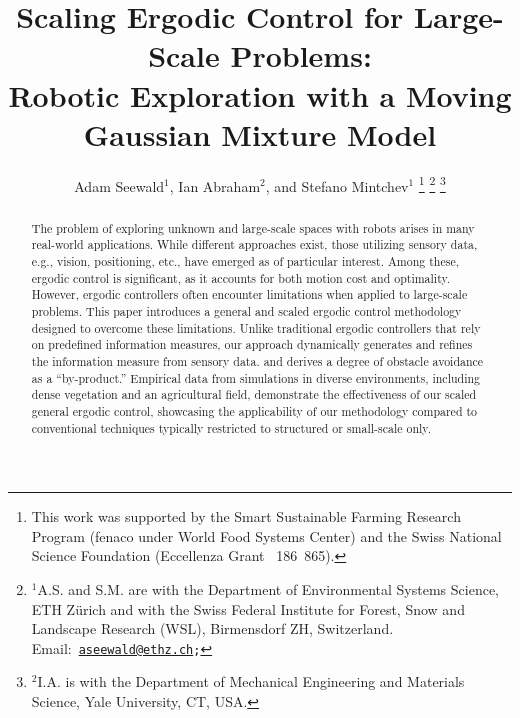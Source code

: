 \documentclass[letterpaper,10pt,conference,twoside]{IEEEtran}
\theoremstyle{definition}
\begin{document}

\title{\LARGE\bf Scaling Ergodic Control for Large-Scale Problems:\\Robotic Exploration with a Moving Gaussian Mixture Model}

\author{Adam Seewald${}^{\text{1}}$, Ian Abraham${}^{\text{2}}$, and Stefano Mintchev${}^{\text{1}}$
  \thanks{%
  This work was supported by the Smart Sustainable Farming Research Program (fenaco under World Food Systems Center) and the Swiss National Science Foundation (Eccellenza Grant \textnumero~186~865).}
  \thanks{${}^{\text{1}}$A.\hspace*{.4ex}S. and S.\hspace*{.4ex}M. are with the Department of Environmental Systems Science, ETH Z{\"u}rich and with the Swiss Federal Institute for Forest, Snow and Landscape Research (WSL), Birmensdorf ZH, Switzerland. Email:~{\tt\footnotesize \href{mailto:aseewald@ethz.ch}{aseewald@ethz.ch};}}
  \thanks{${}^{\text{2}}$I.\hspace*{.4ex}A. is with the Department of Mechanical Engineering and Materials Science, Yale University, CT, USA.}
}

\maketitle

\begin{abstract}
  The problem of exploring unknown and large-scale spaces with robots arises in many real-world applications. While different approaches exist, those utilizing sensory data, e.g., vision, positioning, etc., have emerged as of particular interest. Among these, ergodic control is significant, as it accounts for both motion cost and optimality. However, ergodic controllers often encounter limitations when applied to large-scale problems. This paper introduces a general and scaled ergodic control methodology designed to overcome these limitations. Unlike traditional ergodic controllers that rely on predefined information measures, our approach dynamically generates and refines the information measure from sensory data. and derives a degree of obstacle avoidance as a ``by-product.'' Empirical data from simulations in diverse environments, including dense vegetation and an agricultural field, demonstrate the effectiveness of our scaled general ergodic control, showcasing the applicability of our methodology compared to conventional techniques typically restricted to structured or small-scale only.
\end{abstract}
\end{document}
